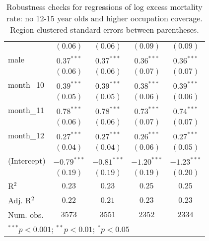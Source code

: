 \begin{table}[h!]
\begin{center}
\begin{small}
\begin{tabular}{l c c c c}
               & $(0.06)$      & $(0.06)$      & $(0.09)$      & $(0.09)$      \\
male           & $0.37^{***}$  & $0.37^{***}$  & $0.36^{***}$  & $0.36^{***}$  \\
               & $(0.06)$      & $(0.06)$      & $(0.07)$      & $(0.07)$      \\
month\_10      & $0.39^{***}$  & $0.39^{***}$  & $0.38^{***}$  & $0.39^{***}$  \\
               & $(0.05)$      & $(0.05)$      & $(0.06)$      & $(0.06)$      \\
month\_11      & $0.78^{***}$  & $0.78^{***}$  & $0.73^{***}$  & $0.74^{***}$  \\
               & $(0.06)$      & $(0.06)$      & $(0.07)$      & $(0.07)$      \\
month\_12      & $0.27^{***}$  & $0.27^{***}$  & $0.26^{***}$  & $0.27^{***}$  \\
               & $(0.04)$      & $(0.04)$      & $(0.06)$      & $(0.05)$      \\
(Intercept)    & $-0.79^{***}$ & $-0.81^{***}$ & $-1.20^{***}$ & $-1.23^{***}$ \\
               & $(0.19)$      & $(0.19)$      & $(0.19)$      & $(0.20)$      \\
\hline
R$^2$          & $0.23$        & $0.23$        & $0.25$        & $0.25$        \\
Adj. R$^2$     & $0.22$        & $0.21$        & $0.23$        & $0.23$        \\
Num. obs.      & $3573$        & $3551$        & $2352$        & $2334$        \\
\hline
\multicolumn{5}{l}{\tiny{$^{***}p<0.001$; $^{**}p<0.01$; $^{*}p<0.05$}}
\end{tabular}
\end{small}
\caption{Robustness checks for regressions of log excess mortality rate: no 12-15 year olds and higher occupation coverage. Region-clustered standard errors between parentheses.}
\label{tab:cutoffmodels}
\end{center}
\end{table}
